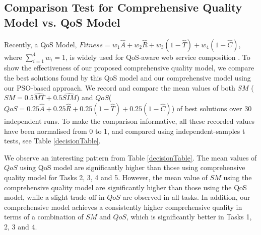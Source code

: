 \subsection{Comparison Test for Comprehensive Quality Model vs. QoS Model}\label{comparisonTest}

Recently, a QoS Model, $Fitness = w_1 \hat{A} + w_2 \hat{R} + w_3(1 - \hat{T}) + w_4(1 - \hat{C})$, where $\sum_{i=1}^{4} w_i = 1$, is widely used for QoS-aware web service composition \cite{ma2015hybrid,da2016particle,da2015graphevol}. To show the effectiveness of our proposed comprehensive quality model, we compare the best solutions found by this QoS model and our comprehensive model using our PSO-based approach. We record and compare the mean values of both $SM$ ($SM = 0.5 \hat{MT} + 0.5 \hat{SIM}$) and $QoS$($QoS = 0.25 \hat{A} + 0.25 \hat{R} + 0.25(1 - \hat{T}) + 0.25(1 - \hat{C})$) of best solutions over 30 independent runs. To make the comparison informative, all these recorded values have been normalised from 0 to 1, and compared using independent-samples t tests, see Table \ref{decisionTable}. 

We observe an interesting pattern from Table \ref{decisionTable}. The mean values of $QoS$ using QoS model are significantly higher than those using comprehensive quality model for Tasks 2, 3, 4 and 5. However, the mean value of $SM$ using the comprehensive quality model are significantly higher than those using the QoS model, while a slight trade-off in $QoS$ are observed in all tasks. In addition, our comprehensive model achieves a consistently higher comprehensive quality in terms of a combination of $SM$ and $QoS$, which is significantly better in Tasks 1, 2, 3 and 4. 

